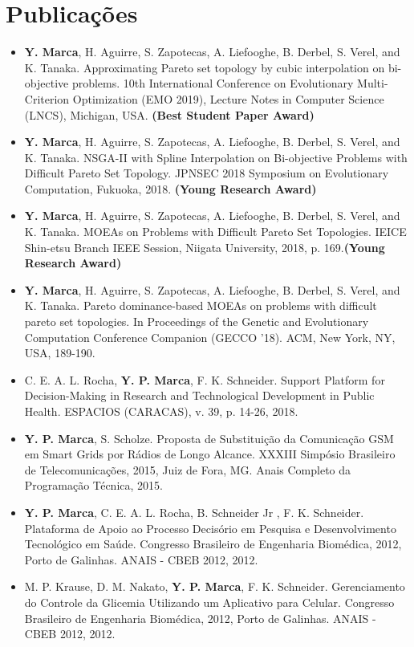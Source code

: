 \documentclass[letterpaper,11pt]{article}
\newcommand{\resumeItemAlt}[2]{
	\vspace{-2pt}
	\item\small{
		\textbf{#1}{#2 \vspace{-2pt}}
	}
}
\newcommand{\resumeItemListStart}{\begin{itemize} }
\newcommand{\resumeItemListEnd}{\end{itemize}\vspace{-5pt}}
\begin{document}
\section{Publicações}
\resumeItemListStart
\resumeItemAlt{}
{\textbf{Y. Marca}, H. Aguirre, S. Zapotecas, A. Liefooghe, B. Derbel, S. Verel, and K. Tanaka. Approximating Pareto set topology by cubic interpolation on bi-objective problems. 10th International Conference on Evolutionary Multi-Criterion Optimization (EMO 2019), Lecture Notes in Computer Science (LNCS), Michigan, USA. \textbf{(Best Student Paper Award)}}	
\resumeItemAlt{}
{\textbf{Y. Marca}, H. Aguirre, S. Zapotecas, A. Liefooghe, B. Derbel, S. Verel, and K. Tanaka. NSGA-II with Spline Interpolation on Bi-objective Problems with Difficult Pareto Set Topology. JPNSEC 2018 Symposium on Evolutionary Computation, Fukuoka, 2018. \textbf{(Young Research Award)}}
\resumeItemAlt{}
{\textbf{Y. Marca}, H. Aguirre, S. Zapotecas, A. Liefooghe, B. Derbel, S. Verel, and K. Tanaka. MOEAs on Problems with Difficult Pareto Set Topologies. IEICE Shin-etsu Branch IEEE Session, Niigata University, 2018, p. 169.\textbf{(Young Research Award)}}
\resumeItemAlt{}
{\textbf{Y. Marca}, H. Aguirre, S. Zapotecas, A. Liefooghe, B. Derbel, S. Verel, and K. Tanaka. Pareto dominance-based MOEAs on problems with difficult pareto set topologies. In Proceedings of the Genetic and Evolutionary Computation Conference Companion (GECCO '18). ACM, New York, NY, USA, 189-190.}
\resumeItemAlt{}
{C. E. A. L. Rocha, \textbf{Y. P. Marca}, F. K. Schneider. Support Platform for Decision-Making in Research and Technological Development in Public Health. ESPACIOS (CARACAS), v. 39, p. 14-26, 2018.}

\resumeItemAlt{}
{\textbf{Y. P. Marca}, S. Scholze. Proposta de Substituição da Comunicação GSM em Smart Grids por Rádios de Longo Alcance. XXXIII Simpósio Brasileiro de Telecomunicações, 2015, Juiz de Fora, MG. Anais Completo da Programação Técnica, 2015.}

\resumeItemAlt{}
{\textbf{Y. P. Marca}, C. E. A. L. Rocha, B. Schneider Jr , F. K. Schneider. Plataforma de Apoio ao Processo Decisório em Pesquisa e Desenvolvimento Tecnológico em Saúde. Congresso Brasileiro de Engenharia Biomédica, 2012, Porto de Galinhas. ANAIS - CBEB 2012, 2012.}
\resumeItemAlt{}
{M. P. Krause, D. M. Nakato, \textbf{Y. P. Marca}, F. K. Schneider. Gerenciamento do Controle da Glicemia Utilizando um Aplicativo para Celular. Congresso Brasileiro de Engenharia Biomédica, 2012, Porto de Galinhas. ANAIS - CBEB 2012, 2012.}

\resumeItemListEnd
\end{document}

